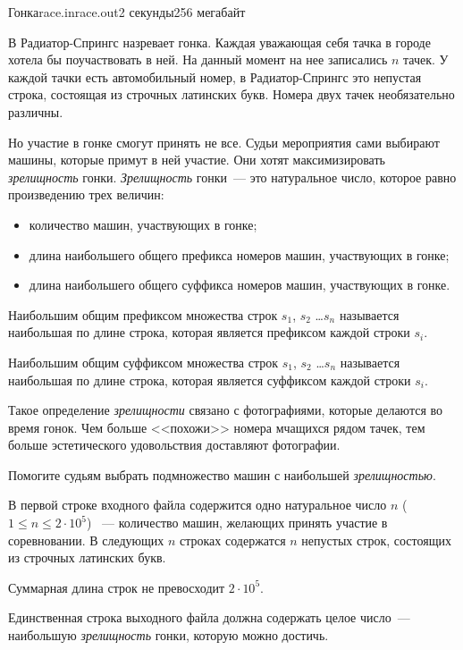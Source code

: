 \begin{problem}{Гонка}{race.in}{race.out}{2 секунды}{256 мегабайт}
                                                                    

В Радиатор-Спрингс назревает гонка. Каждая уважающая себя тачка в городе хотела бы поучаствовать в ней.
На данный момент на нее записались $n$ тачек. У каждой тачки есть автомобильный номер, в Радиатор-Спрингс это непустая строка, 
состоящая из строчных латинских букв. Номера двух тачек необязательно различны.

Но участие в гонке смогут принять не все. Судьи мероприятия сами выбирают машины, которые примут в ней участие.
Они хотят максимизировать \textit{зрелищность} гонки. \textit{Зрелищность} гонки~--- это натуральное число, 
которое равно произведению трех величин: 
\begin{itemize}
  \item количество машин, участвующих в гонке;
  \item длина наибольшего общего префикса номеров машин, участвующих в гонке;
  \item длина наибольшего общего суффикса номеров машин, участвующих в гонке.
\end{itemize}

Наибольшим общим префиксом множества строк $s_1$, $s_2$ \dots $s_n$ называется наибольшая по длине строка, которая является префиксом каждой строки $s_i$.

Наибольшим общим суффиксом множества строк $s_1$, $s_2$ \dots $s_n$ называется наибольшая по длине строка, которая является суффиксом каждой строки $s_i$.

Такое определение \textit{зрелищности} связано с фотографиями, которые делаются во время гонок. Чем больше <<похожи>> номера мчащихся рядом тачек, 
тем больше эстетического удовольствия доставляют фотографии.

Помогите судьям выбрать подмножество машин с наибольшей \textit{зрелищностью}.

\InputFile
В первой строке входного файла содержится одно натуральное число $n$ ($1 \le n \le 2\cdot 10^5$) ~--- количество машин, желающих принять участие в соревновании.
В следующих $n$ строках содержатся $n$ непустых строк, состоящих из строчных латинских букв.

Суммарная длина строк не превосходит $2\cdot 10^5$.

\OutputFile
Единственная строка выходного файла должна содержать целое число~--- наибольшую \textit{зрелищность} гонки, которую можно достичь.


\end{problem}
